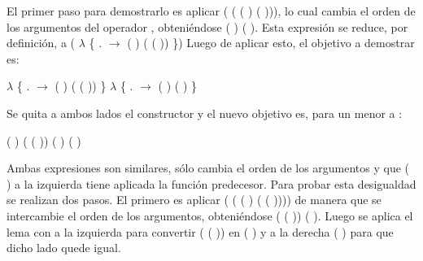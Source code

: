 \begin{AgdaAlign}
El primer paso para demostrarlo es aplicar (\AgdaFunction{$\sim\rightarrow\leq$} ( ( ) ( ))), lo cual cambia el orden de los argumentos del operador , obteniéndose  ( ) ( ). Esta expresión se reduce, por definición, a ( $\lambda$ \{ . $\rightarrow$  ( ) ( ( )) \}) Luego de aplicar esto, el objetivo a demostrar es:
\begin{center}
\AgdaFunction{[}  \AgdaFunction{]}  $\lambda$ \{ . $\rightarrow$  ( ) ( ( )) \} \AgdaFunction{$\leq$}  $\lambda$ \{ . $\rightarrow$  ( ) ( ) \}
\end{center}

Se quita a ambos lados el constructor  y el nuevo objetivo es, para un  menor a :
\begin{center}
\AgdaFunction{[}  \AgdaFunction{]}  ( ) ( ( )) \AgdaFunction{$\leq$}  ( ) ( )
\end{center}

Ambas expresiones son similares, sólo cambia el orden de los argumentos y que ( ) a la izquierda tiene aplicada la función predecesor. Para probar esta desigualdad se realizan dos pasos. El primero es aplicar (\AgdaFunction{$\sim\rightarrow\leq$} ( ( ) ( ( )))) de manera que se intercambie el orden de los argumentos, obteniéndose  ( ( )) ( ). Luego se aplica el lema  con  a la izquierda para convertir ( ( )) en ( ) y a la derecha  ( ) para que dicho lado quede igual.


\end{AgdaAlign}
